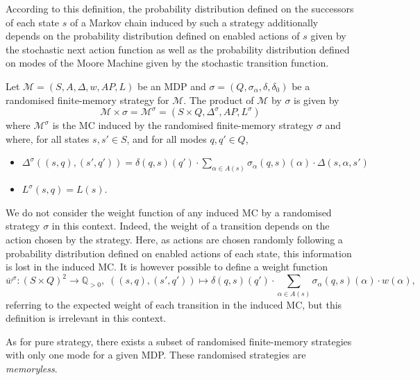According to this definition, the probability distribution defined on the successors of each state $s$ of a Markov chain induced by such a strategy additionally depends on the probability distribution defined on enabled actions of $s$ given by the stochastic next action function as well as the probability distribution defined on modes of the Moore Machine given by the stochastic transition function.

\begin{definition}
  Let $\mathcal{M}=(S, A, \Delta, w, AP, L)$ be an MDP and $\sigma=(Q, \sigma_\alpha, \delta, \delta_0)$ be a randomised finite-memory strategy for $\mathcal{M}$.
  The product of $\mathcal{M}$ by $\sigma$ is given by
  \[
    \mathcal{M} \times \sigma = \mathcal{M}^\sigma = (S \times Q, \Delta^\sigma, AP, L^\sigma)
  \]
  where $\mathcal{M}^\sigma$ is the MC induced by the randomised finite-memory strategy $\sigma$ and where, for all states $s, s' \in S$, and for all modes $q, q' \in Q$,
  \begin{itemize}
    \item $\Delta^\sigma((s, q), (s', q')) =
    \delta(q, s)(q') \cdot \sum_{\alpha \in A(s)} \sigma_\alpha(q, s)(\alpha) \cdot \Delta(s, \alpha, s')$
    \item $L^\sigma(s, q) = L(s)$.
  \end{itemize}
\end{definition}

\begin{remark}
  We do not consider the weight function of any induced MC by a randomised strategy $\sigma$ in this context.
  Indeed, the weight of a transition depends on the action chosen by the strategy. Here, as actions are chosen randomly following a probability distribution defined on enabled actions of each state, this information is lost in the induced MC.
  It is however possible to define a weight function
  \[
    \overline{w}^\sigma: (S \times Q)^2 \rightarrow \mathbb{Q}_{>0}, \; ((s, q), (s', q')) \mapsto \delta(q, s)(q') \cdot \sum_{\alpha \in A(s)} \sigma_{\alpha}(q, s)(\alpha) \cdot w(\alpha),
  \]
  referring to the expected weight of each transition in the induced MC, but this definition is irrelevant in this context.
\end{remark}

As for pure strategy, there exists a subset of randomised finite-memory strategies with only one mode for a given MDP.
These randomised strategies are \textit{memoryless}.

